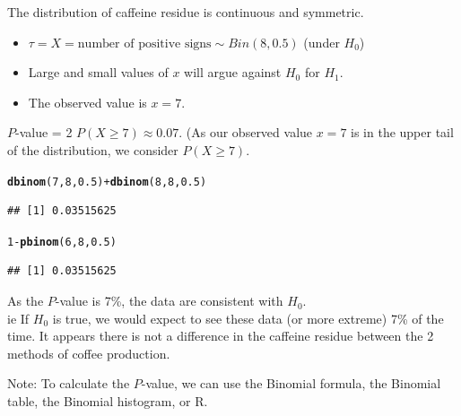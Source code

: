 \documentclass[t,xcolor=pdftex,dvipsnames,table]{beamer}
\makeatletter
\newcommand{\hlnum}[1]{\textcolor[rgb]{0.686,0.059,0.569}{#1}}%
\newcommand{\hlopt}[1]{\textcolor[rgb]{0,0,0}{#1}}%
\newcommand{\hlstd}[1]{\textcolor[rgb]{0.345,0.345,0.345}{#1}}%
\newcommand{\hlkwd}[1]{\textcolor[rgb]{0.737,0.353,0.396}{\textbf{#1}}}%
\newenvironment{kframe}{%
 \def\at@end@of@kframe{}%
 \ifinner\ifhmode%
  \def\at@end@of@kframe{\end{minipage}}%
  \begin{minipage}{\columnwidth}%
 \fi\fi%
 \def\FrameCommand##1{\hskip\@totalleftmargin \hskip-\fboxsep
 \colorbox{shadecolor}{##1}\hskip-\fboxsep
     \hskip-\linewidth \hskip-\@totalleftmargin \hskip\columnwidth}%
 \MakeFramed {\advance\hsize-\width
   \@totalleftmargin\z@ \linewidth\hsize
   \@setminipage}}%
 {\par\unskip\endMakeFramed%
 \at@end@of@kframe}
\newenvironment{knitrout}{}{} %
\makeatother
\begin{document}
\begin{frame}[fragile]{}
 The distribution of caffeine residue is continuous and symmetric.

\vspace{.5cm}
\begin{itemize}
\item $\tau = X =  \mbox{number of positive signs} \sim Bin(8,0.5)$ (under $H_{0}$) 
\item Large and small values of $x$ will argue against $H_{0}$ for $H_{1}$. \\
\item The observed value is $x=7$. 
\end{itemize}

 $P$-value = 2 $P( X \geq 7) \approx 0.07$.
(As our observed value $x=7$ is in the upper tail of the distribution, we consider $P( X \geq 7)$.

\begin{knitrout}
\color{fgcolor}\begin{kframe}
\begin{alltt}
\hlkwd{dbinom}\hlstd{(}\hlnum{7}\hlstd{,}\hlnum{8}\hlstd{,}\hlnum{0.5}\hlstd{)} \hlopt{+} \hlkwd{dbinom}\hlstd{(}\hlnum{8}\hlstd{,}\hlnum{8}\hlstd{,}\hlnum{0.5}\hlstd{)}
\end{alltt}
\begin{verbatim}
## [1] 0.03515625
\end{verbatim}
\begin{alltt}
\hlnum{1}\hlopt{-}\hlkwd{pbinom}\hlstd{(}\hlnum{6}\hlstd{,}\hlnum{8}\hlstd{,}\hlnum{0.5}\hlstd{)}
\end{alltt}
\begin{verbatim}
## [1] 0.03515625
\end{verbatim}
\end{kframe}
\end{knitrout}

\end{frame}

\begin{frame}{}

 As the $P$-value is 7\%, the data are consistent with $H_{0}$. \\
ie If $H_{0}$ is true, we would expect to see these data (or more extreme) 7\% of the time. It appears there is not a difference in the caffeine residue between the 2 methods of coffee production.

\vspace{1cm}
Note: To calculate the $P$-value, we can use the Binomial formula, the Binomial table, the Binomial histogram, or R.

\end{frame}
\end{document}
